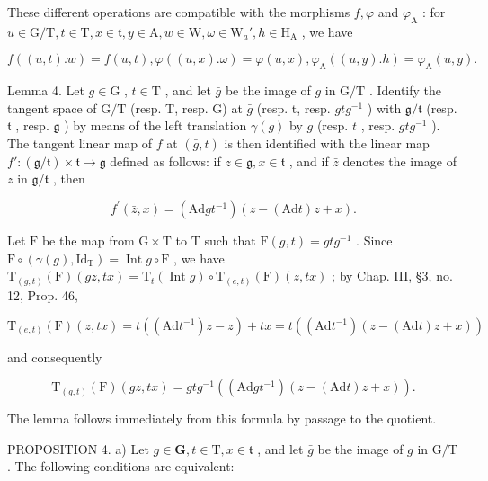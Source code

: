These different operations are compatible with the morphisms \(f, \varphi\) and \(\varphi_{\mathrm{A}}\) : for \(u \in \mathrm{G} / \mathrm{T}, t \in \mathrm{T}, x \in \mathfrak{t}, y \in \mathrm{A}, w \in \mathrm{W}, \omega \in \mathrm{W}_a', h \in \mathrm{H}_{\mathrm{A}}\) , we have

\[
f ((u, t). w) = f (u, t), \varphi ((u, x). \omega) = \varphi (u, x), \varphi_ {\mathrm{A}} ((u, y). h) = \varphi_ {\mathrm{A}} (u, y).
\]

Lemma 4. Let \(g \in \mathrm{G}\) , \(t \in \mathrm{T}\) , and let \(\bar{g}\) be the image of \(g\) in \(\mathrm{G} / \mathrm{T}\) . Identify the tangent space of \(\mathrm{G} / \mathrm{T}\) (resp. T, resp. G) at \(\bar{g}\) (resp. t, resp. \(gtg^{-1}\) ) with \(\mathfrak{g} / \mathfrak{t}\) (resp. \(\mathfrak{t}\) , resp. \(\mathfrak{g}\) ) by means of the left translation \(\gamma(g)\) by \(g\) (resp. \(t\) , resp. \(gtg^{-1}\) ). The tangent linear map of \(f\) at \((\bar{g}, t)\) is then identified with the linear map \(f': (\mathfrak{g} / \mathfrak{t}) \times \mathfrak{t} \to \mathfrak{g}\) defined as follows: if \(z \in \mathfrak{g}, x \in \mathfrak{t}\) , and if \(\bar{z}\) denotes the image of \(z\) in \(\mathfrak{g} / \mathfrak{t}\) , then

\[
f ^ {\prime} (\bar {z}, x) = (\mathrm{Ad} g t ^ {- 1}) (z - (\mathrm{Ad} t) z + x).
\]

Let \(\mathrm{F}\) be the map from \(\mathrm{G} \times \mathrm{T}\) to \(\mathrm{T}\) such that \(\mathrm{F}(g,t) = gtg^{-1}\) . Since \(\mathrm{F} \circ (\gamma(g), \mathrm{Id}_{\mathrm{T}}) = \operatorname{Int} g \circ \mathrm{F}\) , we have \(\mathrm{T}_{(g,t)}(\mathrm{F})(gz, tx) = \mathrm{T}_t(\operatorname{Int} g) \circ \mathrm{T}_{(e,t)}(\mathrm{F})(z, tx)\) ; by Chap. III, §3, no. 12, Prop. 46,

\[
\mathrm{T} _ {(e, t)} (\mathrm{F}) (z, t x) = t ((\mathrm{Ad} t ^ {- 1}) z - z) + t x = t ((\mathrm{Ad} t ^ {- 1}) (z - (\mathrm{Ad} t) z + x))
\]

and consequently

\[
\mathrm{T} _ {(g, t)} (\mathrm{F}) (g z, t x) = g t g ^ {- 1} ((\mathrm{Ad}   g t ^ {- 1}) (z - (\mathrm{Ad}   t) z + x)).
\]

The lemma follows immediately from this formula by passage to the quotient.

PROPOSITION 4. a) Let \(g \in \mathbf{G}, t \in \mathrm{T}, x \in \mathfrak{t}\) , and let \(\bar{g}\) be the image of \(g\) in \(\mathrm{G} / \mathrm{T}\) . The following conditions are equivalent:

